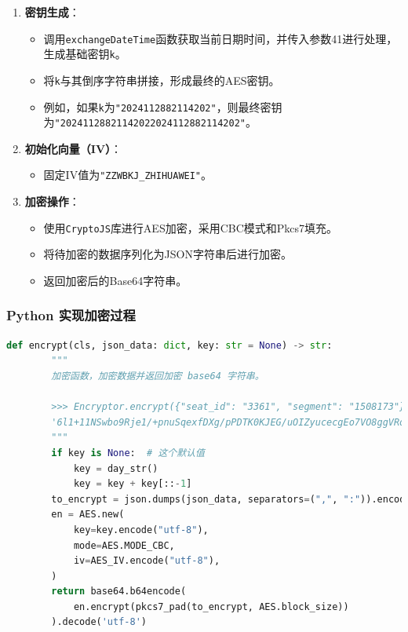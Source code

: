 \documentclass[14pt,a4paper,UTF8,twoside]{article}
\begin{document}
\begin{enumerate}
    \item \textbf{密钥生成}：
    \begin{itemize}
        \item 调用\texttt{exchangeDateTime}函数获取当前日期时间，并传入参数41进行处理，生成基础密钥\texttt{k}。
        \item 将\texttt{k}与其倒序字符串拼接，形成最终的AES密钥。
        \item 例如，如果\texttt{k}为\texttt{"2024112882114202"}，则最终密钥为\texttt{"20241128821142022024112882114202"}。
    \end{itemize}
    
    \item \textbf{初始化向量（IV）}：
    \begin{itemize}
        \item 固定IV值为\texttt{"ZZWBKJ\_ZHIHUAWEI"}。
    \end{itemize}
    
    \item \textbf{加密操作}：
    \begin{itemize}
        \item 使用\texttt{CryptoJS}库进行AES加密，采用CBC模式和Pkcs7填充。
        \item 将待加密的数据序列化为JSON字符串后进行加密。
        \item 返回加密后的Base64字符串。
    \end{itemize}
\end{enumerate}

\subsubsection*{Python 实现加密过程}

\vspace{0.3cm}

\begin{lstlisting}[language=Python, caption=Python加密复现代码]
    def encrypt(cls, json_data: dict, key: str = None) -> str:
        """
        加密函数，加密数据并返回加密 base64 字符串。

        >>> Encryptor.encrypt({"seat_id": "3361", "segment": "1508173"}, "2024112882114202")
        '6l1+11NSwbo9Rje1/+pnuSqexfDXg/pPDTK0KJEG/uOIZyucecgEo7VO8ggVRom9'
        """
        if key is None:  # 这个默认值
            key = day_str()
            key = key + key[::-1]
        to_encrypt = json.dumps(json_data, separators=(",", ":")).encode("utf-8")
        en = AES.new(
            key=key.encode("utf-8"),
            mode=AES.MODE_CBC,
            iv=AES_IV.encode("utf-8"),
        )
        return base64.b64encode(
            en.encrypt(pkcs7_pad(to_encrypt, AES.block_size))
        ).decode('utf-8')
\end{lstlisting}
\end{document}
